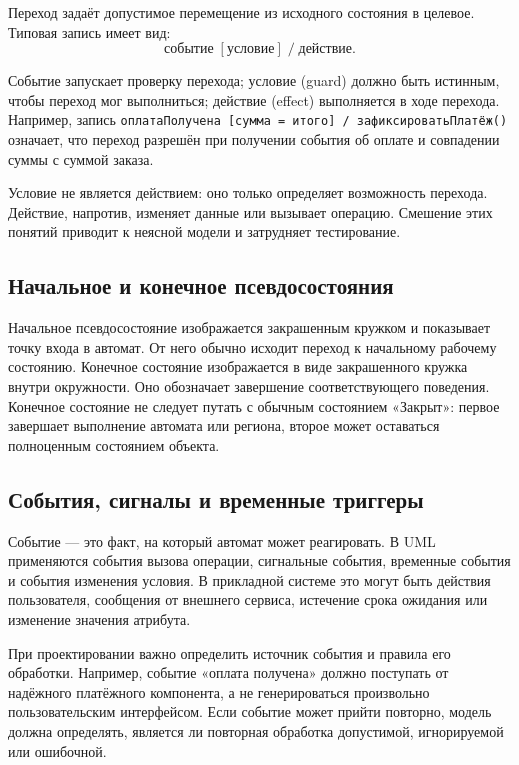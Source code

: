 \documentclass[essay,paper]{pmk-graduate}
\begin{document}
Переход задаёт допустимое перемещение из исходного состояния в целевое. Типовая запись имеет вид:
\[
  \text{событие} \; [\text{условие}] \; / \; \text{действие}.
\]

Событие запускает проверку перехода; условие (guard) должно быть истинным, чтобы переход мог выполниться; действие (effect) выполняется в ходе перехода. Например, запись \texttt{оплатаПолучена [сумма = итого] / зафиксироватьПлатёж()} означает, что переход разрешён при получении события об оплате и совпадении суммы с суммой заказа.

Условие не является действием: оно только определяет возможность перехода. Действие, напротив, изменяет данные или вызывает операцию. Смешение этих понятий приводит к неясной модели и затрудняет тестирование.

\subsection{Начальное и конечное псевдосостояния}

Начальное псевдосостояние изображается закрашенным кружком и показывает точку входа в автомат. От него обычно исходит переход к начальному рабочему состоянию. Конечное состояние изображается в виде закрашенного кружка внутри окружности. Оно обозначает завершение соответствующего поведения. Конечное состояние не следует путать с обычным состоянием «Закрыт»: первое завершает выполнение автомата или региона, второе может оставаться полноценным состоянием объекта.

\subsection{События, сигналы и временные триггеры}

Событие — это факт, на который автомат может реагировать. В UML применяются события вызова операции, сигнальные события, временные события и события изменения условия. В прикладной системе это могут быть действия пользователя, сообщения от внешнего сервиса, истечение срока ожидания или изменение значения атрибута.

При проектировании важно определить источник события и правила его обработки. Например, событие «оплата получена» должно поступать от надёжного платёжного компонента, а не генерироваться произвольно пользовательским интерфейсом. Если событие может прийти повторно, модель должна определять, является ли повторная обработка допустимой, игнорируемой или ошибочной.
\end{document}
